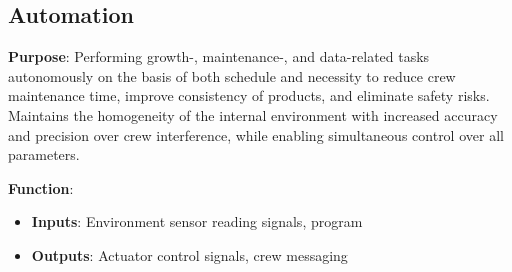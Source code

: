 \subsection{Automation}
\label{sec:automation}

\textbf{Purpose}: Performing growth-, maintenance-, and data-related tasks autonomously on the basis of both schedule and necessity to reduce crew maintenance time, improve consistency of products, and eliminate safety risks. Maintains the homogeneity of the internal environment with increased accuracy and precision over crew interference, while enabling simultaneous control over all parameters.

\textbf{Function}:
\begin{itemize}
    \item \textbf{Inputs}: Environment sensor reading signals, program
    \item \textbf{Outputs}: Actuator control signals, crew messaging
\end{itemize}

